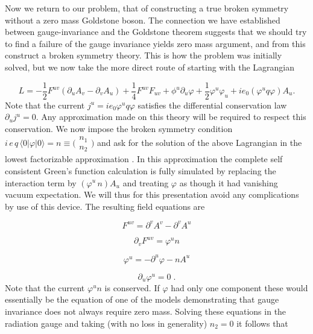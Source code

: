 \documentclass[%
  12pt,
  paper=letter,
  abstracton,
  pagesize=auto,
  version=last,
  DIV=calc
  ]{scrartcl}
\begin{document}
Now we return to our problem, that of constructing a true broken
symmetry without a zero mass Goldstone boson.  The connection we have
established between gauge-invariance and the Goldstone theorem
suggests that we should try to find a failure of the gauge invariance
yields zero mass argument, and from this construct a broken symmetry
theory.  This is how the problem was initially solved, but we now take
the more direct route of starting with the Lagrangian

\begin{equation*}
L=-\frac{1}{2}F^{uv} (\partial_u A_v - \partial_v A_u)+\frac{1}{4} F^{uv} F_{uv} + \phi^u \partial_u \varphi + \frac{1}{2} \varphi^u \varphi_u + i e_0 (\varphi^u q \varphi) A_u.
\end{equation*}
Note that the current $j^u=i e_0 \varphi^u q \varphi$
satisfies the differential conservation law $\partial_u j^u=0$.  Any
approximation made on this theory will be required to respect this
conservation. We now impose the broken symmetry condition $i\, e\, q\,
\langle 0|\varphi|0\rangle = n \equiv \bigl(\begin{smallmatrix}n_1 \\n_2\end{smallmatrix}\bigr)$ and ask for the solution
of the above Lagrangian in the lowest factorizable approximation
\cite{13}.  In this approximation the complete self consistent Green's
function calculation is fully simulated by replacing the interaction
term by $(\varphi^u\, n)A_u$ and treating $\varphi$ as though it had
vanishing vacuum expectation.  We will thus for this presentation
avoid any complications by use of this device.  The resulting field
equations are

\begin{equation*}
F^{uv}=\partial^v A^v-\partial^v A^u
\end{equation*}

\begin{equation*}
\partial_v F^{uv}=\varphi^u n
\end{equation*}

\begin{equation*}
\varphi^u=-\partial^u\varphi-n A^u
\end{equation*}

\begin{equation*}
\partial_u\varphi^u=0\; .
\end{equation*}
Note that the current $\varphi^u n$ is conserved.  If $\varphi$ had
only one component these would essentially be the equation of one of
the models \cite {14} demonstrating that gauge invariance does not
always require zero mass.  Solving these equations in the radiation
gauge and taking (with no loss in generality) $n_2=0$ it follows that
\end{document}
